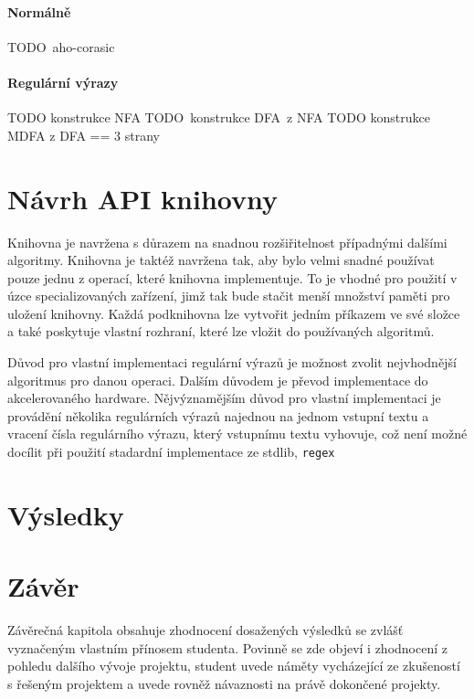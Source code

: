 \subsubsection{Normálně}

TODO aho-corasic

\subsubsection{Regulární výrazy}

TODO konstrukce NFA
TODO konstrukce DFA z NFA
TODO konstrukce MDFA z DFA
== 3 strany


\subsection{}

\chapter{Návrh API knihovny}
Knihovna je navržena s důrazem na snadnou rozšiřitelnost případnými dalšími algoritmy.
Knihovna je taktéž navržena tak, aby bylo velmi snadné používat pouze jednu z operací, které knihovna implementuje.
To je vhodné pro použití v úzce specializovaných zařízení, jimž tak bude stačit menší množství paměti pro uložení knihovny.
Každá podknihovna lze vytvořit jedním příkazem ve své složce a také poskytuje vlastní rozhraní, které lze vložit do používaných algoritmů.

Důvod pro vlastní implementaci regulární výrazů je možnost zvolit nejvhodnější algoritmus pro danou operaci.
Dalším důvodem je převod implementace do akcelerovaného hardware.
Nějvýznamějším důvod pro vlastní implementaci je provádění několika regulárních výrazů najednou na jednom vstupní textu a vracení čísla regulárního výrazu, který vstupnímu textu vyhovuje, což není možné docílit při použití stadardní implementace ze stdlib, {\tt regex}

\chapter{Výsledky}

\chapter{Závěr}
Závěrečná kapitola obsahuje zhodnocení dosažených výsledků se zvlášť vyznačeným vlastním přínosem studenta. Povinně se zde objeví i zhodnocení z pohledu dalšího vývoje projektu, student uvede náměty vycházející ze zkušeností s řešeným projektem a uvede rovněž návaznosti na právě dokončené projekty.

